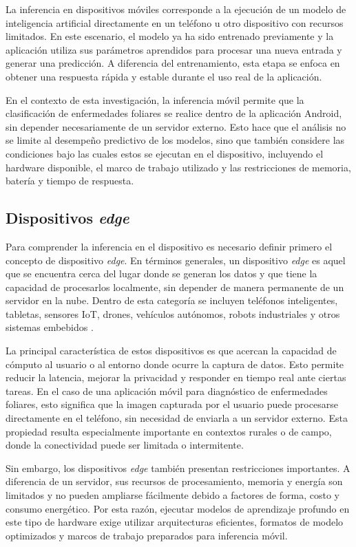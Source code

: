 La inferencia en dispositivos móviles corresponde a la ejecución de un modelo de inteligencia artificial directamente en un teléfono u
otro dispositivo con recursos limitados. En este escenario, el modelo ya ha sido entrenado previamente y la aplicación utiliza sus
parámetros aprendidos para procesar una nueva entrada y generar una predicción. A diferencia del entrenamiento, esta etapa se enfoca en
obtener una respuesta rápida y estable durante el uso real de la aplicación.

En el contexto de esta investigación, la inferencia móvil permite que la clasificación de enfermedades foliares se realice dentro de la
aplicación Android, sin depender necesariamente de un servidor externo. Esto hace que el análisis no se limite al desempeño predictivo de
los modelos, sino que también considere las condiciones bajo las cuales estos se ejecutan en el dispositivo, incluyendo el hardware
disponible, el marco de trabajo utilizado y las restricciones de memoria, batería y tiempo de respuesta.

\subsection{Dispositivos \textit{edge}}
Para comprender la inferencia en el dispositivo es necesario definir primero el concepto de dispositivo \textit{edge}. En términos
generales, un dispositivo \textit{edge} es aquel que se encuentra cerca del lugar donde se generan los datos y que tiene la capacidad de
procesarlos localmente, sin depender de manera permanente de un servidor en la nube. Dentro de esta categoría se incluyen teléfonos
inteligentes, tabletas, sensores IoT, drones, vehículos autónomos, robots industriales y otros sistemas embebidos \cite{wang2025empowering}.

La principal característica de estos dispositivos es que acercan la capacidad de cómputo al usuario o al entorno donde ocurre la captura
de datos. Esto permite reducir la latencia, mejorar la privacidad y responder en tiempo real ante ciertas tareas. En el caso de una
aplicación móvil para diagnóstico de enfermedades foliares, esto significa que la imagen capturada por el usuario puede procesarse
directamente en el teléfono, sin necesidad de enviarla a un servidor externo. Esta propiedad resulta especialmente importante en contextos
rurales o de campo, donde la conectividad puede ser limitada o intermitente.

Sin embargo, los dispositivos \textit{edge} también presentan restricciones importantes. A diferencia de un servidor, sus recursos de
procesamiento, memoria y energía son limitados y no pueden ampliarse fácilmente debido a factores de forma, costo y consumo energético.
Por esta razón, ejecutar modelos de aprendizaje profundo en este tipo de hardware exige utilizar arquitecturas eficientes, formatos de
modelo optimizados y marcos de trabajo preparados para inferencia móvil.

